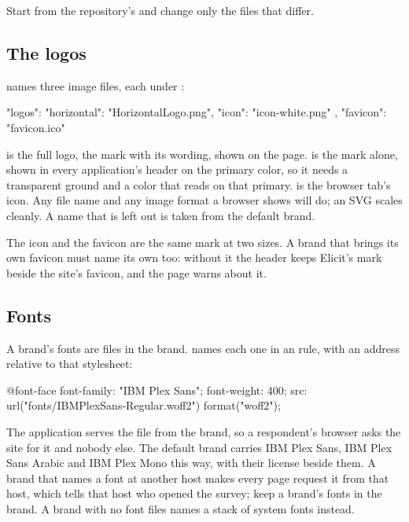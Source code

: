 \documentclass[11pt, a4paper]{article}
\begin{document}
Start from the repository's  and change only the files that differ.

\subsection{The logos}

 names three image files, each under :

\begin{elicitfile}
"logos": {
  "horizontal": "HorizontalLogo.png",
  "icon": "icon-white.png"
},
"favicon": "favicon.ico"
\end{elicitfile}

 is the full logo, the mark with its wording, shown on the  page.
 is the mark alone, shown in every application's header on the primary color, so it
needs a transparent ground and a color that reads on that primary.  is the
browser tab's icon. Any file name and any image format a browser shows will do; an SVG scales
cleanly. A name that is left out is taken from the default brand.

The icon and the favicon are the same mark at two sizes. A brand that brings its own favicon
must name its own  too: without it the header keeps Elicit's mark beside the site's
favicon, and the  page warns about it.

\subsection{Fonts}

A brand's fonts are files in the brand.  names each one in
an  rule, with an address relative to that stylesheet:

\begin{elicitfile}
@font-face {
  font-family: "IBM Plex Sans";
  font-weight: 400;
  src: url("fonts/IBMPlexSans-Regular.woff2") format("woff2");
}
\end{elicitfile}

The application serves the file from the brand, so a respondent's browser asks the site for it
and nobody else. The default brand carries IBM Plex Sans, IBM Plex Sans Arabic and IBM Plex Mono
this way, with their license beside them. A brand that names a font at another host makes every
page request it from that host, which tells that host who opened the survey; keep a brand's
fonts in the brand. A brand with no font files names a stack of system fonts instead.
\end{document}
